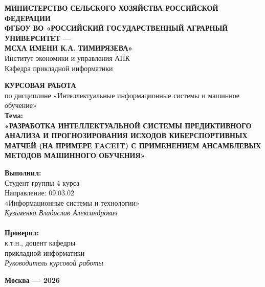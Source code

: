 \documentclass[14pt, a4paper]{extarticle}
\begin{document}
\begin{titlepage}
\begin{center}
    \textbf{МИНИСТЕРСТВО СЕЛЬСКОГО ХОЗЯЙСТВА РОССИЙСКОЙ ФЕДЕРАЦИИ}\\
    \textbf{ФГБОУ ВО «РОССИЙСКИЙ ГОСУДАРСТВЕННЫЙ АГРАРНЫЙ УНИВЕРСИТЕТ ---}\\
    \textbf{МСХА ИМЕНИ К.А. ТИМИРЯЗЕВА»}\\
    \vspace{0.5cm}
    Институт экономики и управления АПК\\
    Кафедра прикладной информатики\\
    \vspace{2.5cm}
    
    {\large \textbf{КУРСОВАЯ РАБОТА}}\\
    \vspace{0.3cm}
    по дисциплине «Интеллектуальные информационные системы и машинное обучение»\\
    \vspace{0.8cm}
    \textbf{Тема:}\\
    \textbf{«РАЗРАБОТКА ИНТЕЛЛЕКТУАЛЬНОЙ СИСТЕМЫ ПРЕДИКТИВНОГО АНАЛИЗА И ПРОГНОЗИРОВАНИЯ ИСХОДОВ КИБЕРСПОРТИВНЫХ МАТЧЕЙ (НА ПРИМЕРЕ FACEIT) С ПРИМЕНЕНИЕМ АНСАМБЛЕВЫХ МЕТОДОВ МАШИННОГО ОБУЧЕНИЯ»}\\
    \vspace{2cm}

    \begin{flushright}
        \begin{minipage}{0.48\textwidth}
            \textbf{Выполнил:}\\
            Студент группы 4 курса\\
            Направление: 09.03.02\\
            «Информационные системы и технологии»\\
            \textit{Кузьменко Владислав Александрович}\\
            \vspace{0.4cm}\\
            \textbf{Проверил:}\\
            к.т.н., доцент кафедры\\
            прикладной информатики\\
            \textit{Руководитель курсовой работы}\\
        \end{minipage}
    \end{flushright}

    \vfill
    {\textbf{Москва --- 2026}}
\end{center}
\end{titlepage}
\end{document}
